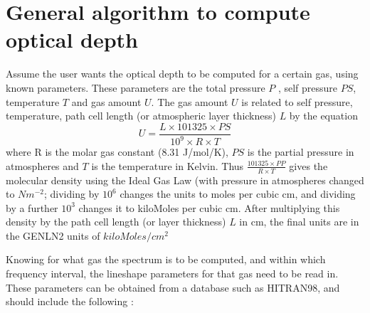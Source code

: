 \documentclass[11pt]{article}
\begin{document}
\section{General algorithm to compute optical depth}
Assume the user wants the optical depth to be computed for a certain gas, 
using known parameters. These parameters are the total pressure $P$ , 
self pressure $PS$, temperature $T$ and gas amount $U$. The gas amount $U$ 
is related to self pressure, temperature, path cell length 
(or atmospheric layer thickness) $L$ by the equation 
\[ 
U = \frac{L \times 101325 \times PS}{10^{9} \times R \times T}
\]
where R is the molar gas constant (8.31 J/mol/K), $PS$ is the partial 
pressure in atmospheres and $T$ is the temperature in Kelvin. Thus 
$\frac{101325 \times PP}{R \times T}$ gives the molecular density using 
the Ideal Gas Law (with pressure in atmospheres changed to $Nm^{-2}$; 
dividing by $10^{6}$ changes the units to moles per cubic cm, and dividing 
by a further $10^{3}$ changes it to kiloMoles per cubic cm. After 
multiplying this density by the path cell length  (or layer thickness) $L$ 
in cm, the final units are in the GENLN2 units of $kiloMoles/cm^{2}$
 
Knowing for what gas the spectrum is to be computed, and within which 
frequency interval, the lineshape parameters for that gas need to be read 
in. These  parameters can be obtained from a database such as HITRAN98, 
and should include the following : 
\end{document}
